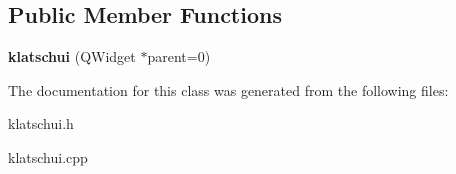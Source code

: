 \subsection*{Public Member Functions}
\begin{DoxyCompactItemize}
\item 
{\bfseries klatschui} (Q\+Widget $\ast$parent=0)\hypertarget{classklatschui_af0ca8331e7ccaf0b8a05bdaf6500b456}{}\label{classklatschui_af0ca8331e7ccaf0b8a05bdaf6500b456}

\end{DoxyCompactItemize}


The documentation for this class was generated from the following files\+:\begin{DoxyCompactItemize}
\item 
klatschui.\+h\item 
klatschui.\+cpp\end{DoxyCompactItemize}
